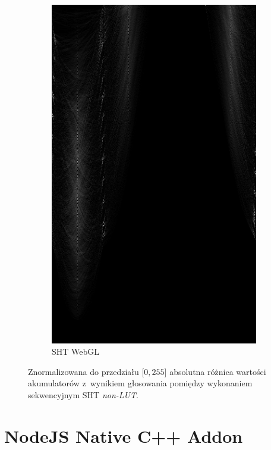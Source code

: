 \begin{figure}[h]
\begin{subfigure}{0.3\textwidth}
        \includegraphics[width=\linewidth] {../../packages/js-benchmarks/img/diff_seq_gpu.png}
        \caption{SHT WebGL}\label{fig:diff:gpu}
    \end{subfigure}
    \caption{Znormalizowana do przedziału $\lbrack 0, 255\rbrack$ absolutna różnica wartości akumulatorów z~wynikiem głosowania pomiędzy wykonaniem sekwencyjnym SHT \textit{non-LUT}.}\label{fig:diff}
\end{figure}



\section{NodeJS Native C++ Addon}

